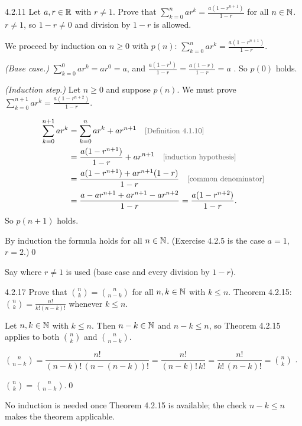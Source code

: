 \begin{bookex}[essential]{4.2.11}
Let $a,r\in\mathbb{R}$ with $r\ne1$. Prove that $\displaystyle\sum_{k=0}^nar^k=\frac{a(1-r^{n+1})}{1-r}$ for all $n\in\mathbb{N}$.
\solution
\given $r\ne1$, so $1-r\ne0$ and division by $1-r$ is allowed.
\begin{steps}
\item We proceed by induction on $n\ge0$ with $p(n)$: $\sum_{k=0}^nar^k=\frac{a(1-r^{n+1})}{1-r}$.
\item \emph{(Base case.)} $\sum_{k=0}^0ar^k=ar^0=a$, and $\frac{a(1-r^1)}{1-r}=\frac{a(1-r)}{1-r}=a$ . So $p(0)$ holds.
\item \emph{(Induction step.)} Let $n\ge0$ and suppose $p(n)$. We must prove $\sum_{k=0}^{n+1}ar^k=\frac{a(1-r^{n+2})}{1-r}$.
\item
\begin{align*}
\sum_{k=0}^{n+1}ar^k&=\sum_{k=0}^nar^k+ar^{n+1}\why{Definition 4.1.10}\\
&=\frac{a(1-r^{n+1})}{1-r}+ar^{n+1}\why{induction hypothesis}\\
&=\frac{a(1-r^{n+1})+ar^{n+1}(1-r)}{1-r}\why{common denominator}\\
&=\frac{a-ar^{n+1}+ar^{n+1}-ar^{n+2}}{1-r}=\frac{a(1-r^{n+2})}{1-r}.
\end{align*}
So $p(n+1)$ holds.
\end{steps}
\conclusion By induction the formula holds for all $n\in\mathbb{N}$. (Exercise 4.2.5 is the case $a=1$, $r=2$.)\qed
\begin{compare}
\item Say where $r\ne1$ is used (base case and every division by $1-r$).
\end{compare}
\end{bookex}

\begin{bookex}[recommended]{4.2.17}
Prove that $\binom nk=\binom n{n-k}$ for all $n,k\in\mathbb{N}$ with $k\le n$.
\solution
\given Theorem 4.2.15: $\binom nk=\frac{n!}{k!(n-k)!}$ whenever $k\le n$.
\begin{steps}
\item Let $n,k\in\mathbb{N}$ with $k\le n$. Then $n-k\in\mathbb{N}$ and $n-k\le n$, so Theorem 4.2.15 applies to both $\binom nk$ and $\binom n{n-k}$.
\item $\binom n{n-k}=\dfrac{n!}{(n-k)!\,(n-(n-k))!}=\dfrac{n!}{(n-k)!\,k!}=\dfrac{n!}{k!\,(n-k)!}=\binom nk$ .
\end{steps}
\conclusion $\binom nk=\binom n{n-k}$.\qed
\begin{compare}
\item No induction is needed once Theorem 4.2.15 is available; the check $n-k\le n$ makes the theorem applicable.
\end{compare}
\end{bookex}

